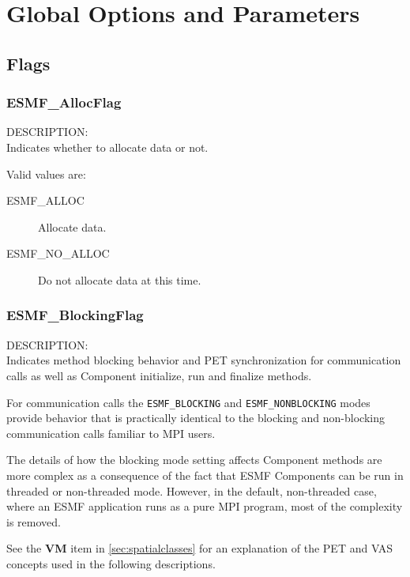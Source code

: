 
\section{Global Options and Parameters}

\subsection{Flags}

\subsubsection{ESMF\_AllocFlag}
\label{opt:allocflag}
{\sf DESCRIPTION:\\}  
Indicates whether to allocate data or not.

Valid values are:
\begin{description}
\item [ESMF\_ALLOC]
      Allocate data. 
\item [ESMF\_NO\_ALLOC]
      Do not allocate data at this time. 
\end{description}

\subsubsection{ESMF\_BlockingFlag}
\label{opt:blockingflag}
{\sf DESCRIPTION:\\}  
Indicates method blocking behavior and PET synchronization for communication
calls as well as Component initialize, run and finalize methods.

For communication calls the {\tt ESMF\_BLOCKING} and {\tt ESMF\_NONBLOCKING}
modes provide behavior that is practically identical to the blocking and
non-blocking communication calls familiar to MPI users.

The details of how the blocking mode setting affects Component methods are
more complex as a consequence of the fact that ESMF Components can be run in
threaded or non-threaded mode. However, in the default, non-threaded case, where
an ESMF application runs as a pure MPI program, most of the complexity is
removed.

See the {\bf VM} item in \ref{sec:spatialclasses} for an
explanation of the PET and VAS concepts used in the following
descriptions.
         
